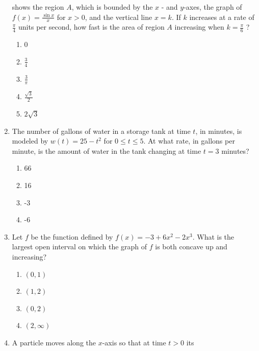 \documentclass{article}
\begin{document}
\begin{enumerate}
\begin{minipage}[t]{\linewidth}
shows the region \(A\), which is bounded by the \(x\) - and \(y\)-axes,
the graph of \(f(x)=\frac{\sin x}{x}\) for \(x>0\), and the vertical
line \(x=k\). If \(k\) increases at a rate of \(\frac{\pi}{4}\) units
per second, how fast is the area of region \(A\) increasing when
\(k=\frac{\pi}{6}\) ?
\vspace{1em}
		\begin{enumerate}
		\itemsep1em
			\item 0
			\item \(\frac{3}{4}\)
			\item \(\frac{3}{\pi}\)
			\item \(\frac{\sqrt{3}}{2}\)
			\item \(2 \sqrt{3}\)
		\end{enumerate}
	\end{minipage}
	\item
	\begin{minipage}[t]{\linewidth}
		The number of gallons of water in a storage tank at time \(t\), in
minutes, is modeled by \(w(t)=25-t^{2}\) for \(0 \leq t \leq 5\). At
what rate, in gallons per minute, is the amount of water in the tank
changing at time \(t=3\) minutes?
\vspace{1em}
		\begin{enumerate}
		\itemsep1em
			\item 66
			\item 16
			\item -3
			\item -6
		\end{enumerate}
	\end{minipage}
	\item
	\begin{minipage}[t]{\linewidth}
		Let \(f\) be the function defined by \(f(x)=-3+6 x^{2}-2 x^{3}\). What
is the largest open interval on which the graph of \(f\) is both concave
up and increasing?
\vspace{1em}
		\begin{enumerate}
		\itemsep1em
			\item \((0,1)\)
			\item \((1,2)\)
			\item \((0,2)\)
			\item \((2, \infty)\)
		\end{enumerate}
	\end{minipage}
	\item
	\begin{minipage}[t]{\linewidth}
		A particle moves along the \(x\)-axis so that at time \(t>0\) its

\end{minipage}
\end{enumerate}
\end{document}
